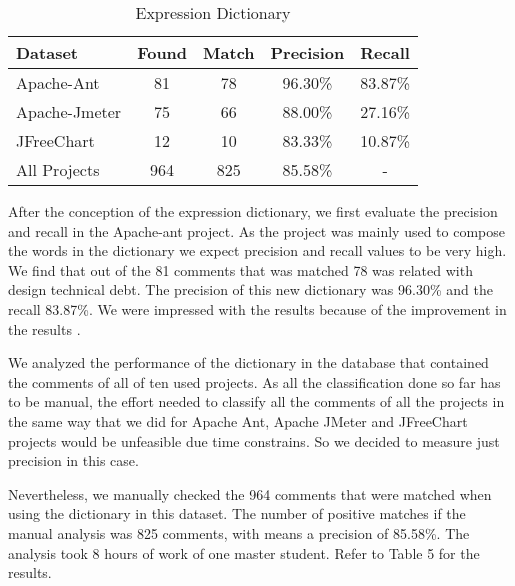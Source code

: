 \begin{table}[!hbt]
    \begin{center}
        \caption{Expression Dictionary}
        \label{tab:dictionaryExpression}
        \begin{tabular}{l| c c c c} 
            \toprule
            \textbf{Dataset} & \textbf{Found} &  \textbf{Match}  &  \textbf{Precision} & \textbf{Recall} \\
            \midrule
            Apache-Ant    & 81 & 78 & 96.30\% & 83.87\% \\ 
            Apache-Jmeter & 75 & 66 & 88.00\% & 27.16\% \\ 
            JFreeChart    & 12 & 10 & 83.33\% & 10.87\% \\ 
            All Projects  & 964 & 825 & 85.58\% & - \\  
            \bottomrule
        \end{tabular}
    \end{center}
\end{table}


After the conception of the expression dictionary, we first evaluate the precision and recall in the Apache-ant project. As the project was mainly used to compose the words in the dictionary we expect precision and recall values to be very high. We find that out of the 81 comments that was matched 78 was related with  design technical debt. The precision of this new dictionary was 96.30\% and the recall 83.87\%. We were impressed with the results because of the improvement in the results . 

We analyzed the performance of the dictionary in the database that contained the comments of all of ten used projects. As all the classification done so far has to be manual, the effort needed to classify all the comments of all the projects  in the same way that we did for Apache Ant, Apache JMeter and JFreeChart projects would be unfeasible due time constrains. So we decided to measure just precision in this case. 

Nevertheless, we manually checked the 964 comments that were matched when using the dictionary in this dataset. The number of positive matches if the manual analysis was 825 comments, with means a precision of 85.58\%. The analysis took 8 hours of work of one master student. Refer to Table 5  for the results.


